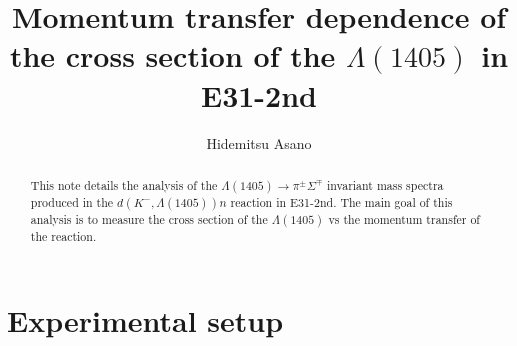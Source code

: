 \documentclass[a4paper]{article}
\title{Momentum transfer dependence of the cross section of the $\Lambda(1405)$ in E31-2nd }
\author{Hidemitsu Asano}
\date{}
\newcommand{\pS}{\mbox{$\pi^{\pm}\Sigma^{\mp}$}\xspace}
\begin{document}
\maketitle
\vspace{4em}
\begin{abstract}
\noindent This note details the analysis of the $\Lambda(1405)\rightarrow \pS $ invariant mass spectra produced in the $d(K^-,\Lambda(1405))n$ reaction in E31-2nd. The main goal of this analysis is to measure the cross section of the $\Lambda(1405)$ vs the momentum transfer of the reaction.
\end{abstract}
\tableofcontents

\clearpage
\listoffigures

\clearpage
\listoftables

\clearpage
{}




\section{Experimental setup}

















\begin{appendices}


\end{appendices}




\end{document}
